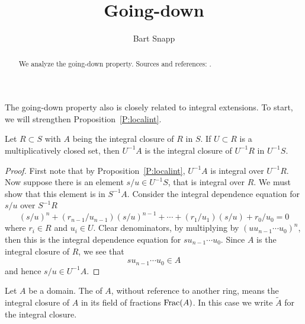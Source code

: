 \documentclass{ximera}
\author{Bart Snapp}
\title{Going-down}
\begin{document}
\begin{abstract}
  We analyze the going-down property. Sources and references:
  \cite{AM1969}.
\end{abstract}
\maketitle

The going-down property also is closely related to integral
extensions. To start, we will strengthen Proposition~\ref{P:localint}.


\begin{proposition}\label{P:localintS}
  Let $R\subset S$ with $A$ being the integral closure of $R$
  in $S$. If $U\subset R$ is a multiplicatively closed set, then
  $U^{-1}A$ is the integral closure of $U^{-1}R$ in $U^{-1}S$.
  \begin{proof}
    First note that by Proposition~\ref{P:localint}, $U^{-1} A$ is
    integral over $U^{-1} R$. Now suppose there is an element $s/u\in
    U^{-1} S$, that is integral over $R$.  We must show that this
    element is in $S^{-1} A$. Consider the integral dependence
    equation for $s/u$ over $S^{-1} R$
    \[
    (s/u)^{n} + \left(r_{n-1}/u_{n-1}\right)(s/u)^{n-1}+\cdots +  \left(r_{1}/u_{1}\right)(s/u) + r_{0}/u_{0} = 0
    \]
    where $r_i\in R$ and $u_i\in U$. Clear denominators, by
    multiplying by $(uu_{n-1}\cdots u_0)^n$, then this is the integral
    dependence equation for $su_{n-1}\cdots u_0$. Since $A$ is the
    integral closure of $R$, we see that
    \[
    su_{n-1}\cdots u_0\in A
    \]
    and hence $s/u\in U^{-1} A$.
  \end{proof}
\end{proposition}


\begin{definition}
  Let $A$ be a domain. The  of $A$, without
  reference to another ring, means the integral closure of $A$ in its
  field of fractions $\operatorname{Frac}(A)$. In this case we write $\tilde{A}$ for
  the integral closure.
\end{definition}
\end{document}
